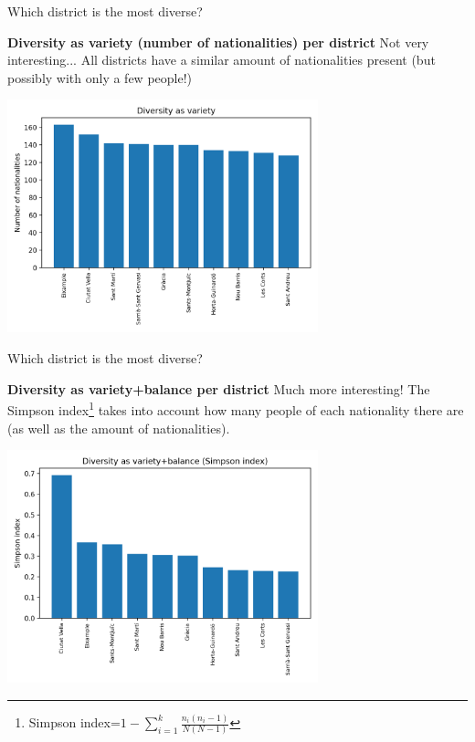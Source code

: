 \documentclass[8pt]{beamer}
\begin{document}
\begin{frame}{Which district is the most diverse?}

\begin{block}{\textbf{Diversity as variety (number of nationalities) per district}} Not very interesting... All districts have a similar amount of nationalities present (but possibly with only a few people!)
\end{block}

\includegraphics[width=9cm]{diversity_as_variety_districtes.png}



\end{frame}

\begin{frame}{Which district is the most diverse?}
\begin{block}{\textbf{Diversity as variety+balance per district}} 
Much more interesting! The Simpson index\footnote[0]{Simpson index=$1-\sum_{i=1}^{k}\frac{n_{i}(n_{i}-1)}{N(N-1)}$} takes into account how many people of each nationality there are (as well as the amount of nationalities).
\end{block}

\includegraphics[width=9cm]{diversity_simpson_districts.png}

\end{frame}
\end{document}
